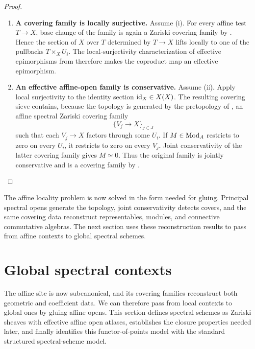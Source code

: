 \begin{proof}
\leavevmode
\begin{enumerate}[label=\textup{(\arabic*)}]
    \item \textbf{A covering family is locally surjective.}
    Assume \textup{(i)}. For every affine test \(T\to X\), base change of
    the family is again a Zariski covering family by
    . Hence the section of \(X\) over
    \(T\) determined by \(T\to X\) lifts locally to one of the pullbacks
    \(T\times_XU_i\). The local-surjectivity characterization of effective
    epimorphisms from
     therefore makes the coproduct
    map an effective epimorphism.

    \item \textbf{An effective affine-open family is conservative.}
    Assume \textup{(ii)}. Apply local surjectivity to the identity section
    \(\operatorname{id}_X\in X(X)\). The resulting covering sieve contains, because the
    topology is generated by the pretopology of
    , an affine spectral Zariski
    covering family
    \[
        \{V_j\longrightarrow X\}_{j\in J}
    \]
    such that each \(V_j\to X\) factors through some \(U_i\). If
    \(M\in\operatorname{Mod}_A\) restricts to zero on every \(U_i\), it restricts to zero
    on every \(V_j\). Joint conservativity of the latter covering family
    gives \(M\simeq0\). Thus the original family is jointly conservative
    and is a covering family by .
\end{enumerate}
\end{proof}

The affine locality problem is now solved in the form needed for gluing.
Principal spectral opens generate the topology, joint conservativity detects
covers, and the same covering data reconstruct representables, modules, and
connective commutative algebras. The next section uses these reconstruction
results to pass from affine contexts to global spectral schemes.

\section{Global spectral contexts}
\label{sec:spectral-stacks-schemes}

The affine site is now subcanonical, and its covering families reconstruct
both geometric and coefficient data. We can therefore pass from local
contexts to global ones by gluing affine opens. This section defines spectral
schemes as Zariski sheaves with effective affine open atlases, establishes the
closure properties needed later, and finally identifies this functor-of-points
model with the standard structured spectral-scheme model.

